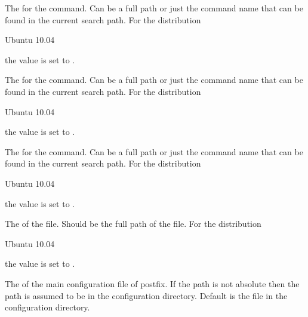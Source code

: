 The  for the  command. Can be a full path or
just the command name that can be found in the current search path.
For the distribution
\begin{inparaitem}
\item[\TheDistribution{ubuntu}] Ubuntu 10.04
\end{inparaitem}
the value is set to .


The  for the  command. Can be a full path or
just the command name that can be found in the current search path.
For the distribution
\begin{inparaitem}
\item[\TheDistribution{ubuntu}] Ubuntu 10.04
\end{inparaitem}
the value is set to .


The  for the  command. Can be a full path or
just the command name that can be found in the current search path.
For the distribution
\begin{inparaitem}
\item[\TheDistribution{ubuntu}] Ubuntu 10.04
\end{inparaitem}
the value is set to .


The  of the  file. Should be the full path 
of the file.
For the distribution
\begin{inparaitem}
\item[\TheDistribution{ubuntu}] Ubuntu 10.04
\end{inparaitem}
the value is set to .


The  of the main configuration file of postfix.
If the path is not absolute then the path is assumed to be
in the configuration directory.
Default is the file  in the configuration directory.

